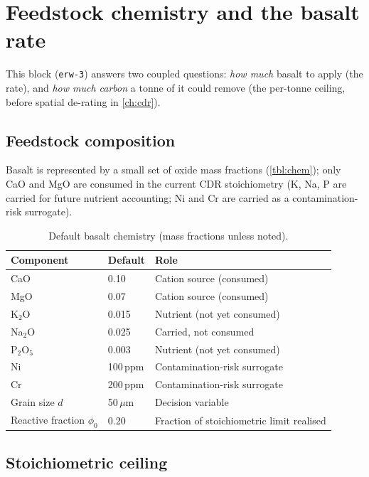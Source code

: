 \documentclass[openany]{book}
\newcommand{\um}{\ensuremath{\mu\mathrm{m}}}
\begin{document}
\chapter{Feedstock chemistry and the basalt rate}\label{ch:feedstock}

This block (\texttt{erw-3}) answers two coupled questions: \emph{how much} basalt
to apply (the rate), and \emph{how much carbon} a tonne of it could remove (the
per-tonne ceiling, before spatial de-rating in \autoref{ch:cdr}).

\section{Feedstock composition}

Basalt is represented by a small set of oxide mass fractions
(\autoref{tbl:chem}); only CaO and MgO are consumed in the current CDR
stoichiometry (K, Na, P are carried for future nutrient accounting; Ni and Cr
are carried as a contamination-risk surrogate).

\begin{longtable}[]{@{}lll@{}}
\caption{Default basalt chemistry (mass fractions unless noted).}\label{tbl:chem}\\
\toprule
Component & Default & Role \\
\midrule
\endhead
CaO & 0.10 & Cation source (consumed) \\
MgO & 0.07 & Cation source (consumed) \\
K$_2$O & 0.015 & Nutrient (not yet consumed) \\
Na$_2$O & 0.025 & Carried, not consumed \\
P$_2$O$_5$ & 0.003 & Nutrient (not yet consumed) \\
Ni & 100\,ppm & Contamination-risk surrogate \\
Cr & 200\,ppm & Contamination-risk surrogate \\
Grain size $d$ & 50\,\um & Decision variable \\
Reactive fraction $\phi_0$ & 0.20 & Fraction of stoichiometric limit realised \\
\bottomrule
\end{longtable}

\section{Stoichiometric ceiling}
\end{document}
